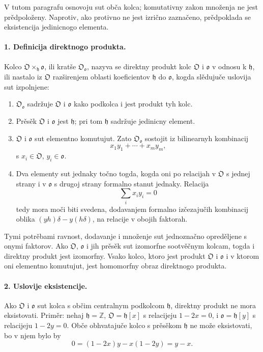 \documentclass[11pt]{article}
\begin{document}
V tutom paragrafu osnovoju sut obča kolca; komutativny zakon množenja ne jest prědpoloženy. Naprotiv, ako protivno ne jest izrično zaznačeno, prědpoklada se eksistencija jedinicnogo elementa.

\paragraph{1. Definicija direktnogo produkta.}
Kolco \(\mathfrak O\times_{\mathfrak h}\mathfrak o\), ili kratše \(\mathfrak O_{\mathfrak o}\), nazyva se direktny produkt kolc \(\mathfrak O\) i \(\mathfrak o\) v odnosu k \(\mathfrak h\), ili nastalo iz \(\mathfrak O\) razširenjem oblasti koeficientov \(\mathfrak h\) do \(\mathfrak o\), kogda slědujuče uslovija sut izpolnjene:

\begin{enumerate}
\item \(\mathfrak O_{\mathfrak o}\) sadržuje \(\mathfrak O\) i \(\mathfrak o\) kako podkolca i jest produkt tyh kolc.
\item Prěsěk \(\mathfrak O\) i \(\mathfrak o\) jest \(\mathfrak h\); pri tom \(\mathfrak h\) sadržuje jedinicny element.
\item \(\mathfrak O\) i \(\mathfrak o\) sut elementno komutujut. Zato \(\mathfrak O_{\mathfrak o}\) sostojit iz bilinearnyh kombinacij
\[
        x_1y_1+\cdots+x_my_m,
\]
s \(x_i\in\mathfrak O\), \(y_i\in\mathfrak o\).
\item Dva elementy sut jednaky točno togda, kogda oni po relacijah v \(\mathfrak O\) s jednej strany i v \(\mathfrak o\) s drugoj strany formalno stanut jednaky. Relacija
\[
        \sum_i x_i y_i=0
\]
tedy mora moči biti svedena, dodavanjem formalno izčezajučih kombinacij oblika \((yh)\delta-y(h\delta)\), na relacije v obojih faktorah.
\end{enumerate}

Tymi potrěbami ravnost, dodavanje i množenje sut jednoznačno opreděljene s onymi faktorov. Ako \(\mathfrak O\), \(\mathfrak o\) i jih prěsěk sut izomorfne sootvěčnym kolcam, togda i direktny produkt jest izomorfny. Vsako kolco, ktoro jest produkt \(\mathfrak O\) i \(\mathfrak o\) i v ktorom oni elementno komutujut, jest homomorfny obraz direktnogo produkta.

\paragraph{2. Uslovije eksistencije.}
Ako \(\mathfrak O\) i \(\mathfrak o\) sut kolca s občim centralnym podkolcom \(\mathfrak h\), direktny produkt ne mora eksistovati. Priměr: nehaj \(\mathfrak h=\mathbb Z\), \(\mathfrak O=\mathfrak h[x]\) s relacijeju \(1-2x=0\), i \(\mathfrak o=\mathfrak h[y]\) s relacijeju \(1-2y=0\). Obče obhvatajuče kolco s prěsěkom \(\mathfrak h\) ne može eksistovati, bo v njem bylo by
\[
        0=(1-2x)y-x(1-2y)=y-x.
\]
\end{document}
